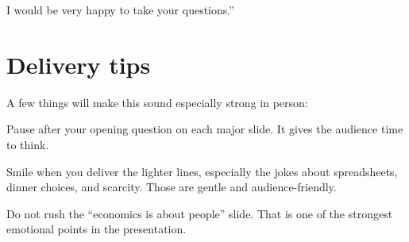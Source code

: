 \documentclass[12pt]{article}
\begin{document}
I would be very happy to take your questions.''

\section*{Delivery tips}

A few things will make this sound especially strong in person:

Pause after your opening question on each major slide. It gives the audience time to think.

Smile when you deliver the lighter lines, especially the jokes about spreadsheets, dinner choices, and scarcity. Those are gentle and audience-friendly.

Do not rush the ``economics is about people'' slide. That is one of the strongest emotional points in the presentation.
\end{document}
